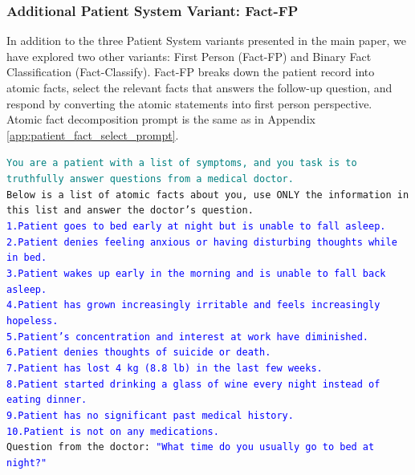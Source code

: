 \subsubsection{Additional Patient System Variant: Fact-FP}\label{app:patient_fact_fp_prompt}
In addition to the three Patient System variants presented in the main paper, we have explored two other variants: First Person (Fact-FP) and Binary Fact Classification (Fact-Classify). Fact-FP breaks down the patient record into atomic facts, select the relevant facts that answers the follow-up question, and respond by converting the atomic statements into first person perspective. Atomic fact decomposition prompt is the same as in Appendix \ref{app:patient_fact_select_prompt}.\\


\begin{tcolorbox}[title={Patient Response Generation Prompt -- Fact-FP}, colframe=gray]
\small\texttt{\textcolor{teal}{You are a patient with a list of symptoms, and you task is to truthfully answer questions from a medical doctor.}\vspace{4mm}\\
Below is a list of atomic facts about you, use ONLY the information in this list and answer the doctor's question.\\
        \textcolor{blue}{1.Patient goes to bed early at night but is unable to fall asleep.\\
        2.Patient denies feeling anxious or having disturbing thoughts while in bed.\\
        3.Patient wakes up early in the morning and is unable to fall back asleep.\\
        4.Patient has grown increasingly irritable and feels increasingly hopeless.\\
        5.Patient's concentration and interest at work have diminished.\\
        6.Patient denies thoughts of suicide or death.\\
        7.Patient has lost 4 kg (8.8 lb) in the last few weeks.\\
        8.Patient started drinking a glass of wine every night instead of eating dinner.\\
        9.Patient has no significant past medical history.\\
        10.Patient is not on any medications.}\vspace{4mm}\\
Question from the doctor: \textcolor{blue}{"What time do you usually go to bed at night?"}\vspace{4mm}\\
}
\end{tcolorbox}

